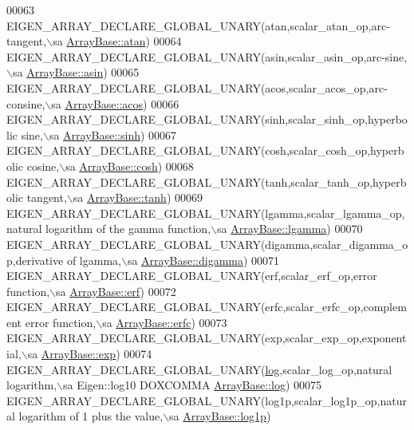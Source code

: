 \begin{DoxyCode}
00063   EIGEN\_ARRAY\_DECLARE\_GLOBAL\_UNARY(atan,scalar\_atan\_op,arc-tangent,\(\backslash\)sa 
      \hyperlink{group___core___module_a3d7c83346563ef1abac3c75615959595}{ArrayBase::atan})
00064   EIGEN\_ARRAY\_DECLARE\_GLOBAL\_UNARY(asin,scalar\_asin\_op,arc-sine,\(\backslash\)sa 
      \hyperlink{group___core___module_a6d090b549b70fcb9468d16341c2204f2}{ArrayBase::asin})
00065   EIGEN\_ARRAY\_DECLARE\_GLOBAL\_UNARY(acos,scalar\_acos\_op,arc-consine,\(\backslash\)sa 
      \hyperlink{group___core___module_a823b8a01037260c26ea853f41a75dd87}{ArrayBase::acos})
00066   EIGEN\_ARRAY\_DECLARE\_GLOBAL\_UNARY(sinh,scalar\_sinh\_op,hyperbolic sine,\(\backslash\)sa 
      \hyperlink{group___core___module_a0984c5e3b76efa0c66a754ea7106f5b9}{ArrayBase::sinh})
00067   EIGEN\_ARRAY\_DECLARE\_GLOBAL\_UNARY(cosh,scalar\_cosh\_op,hyperbolic cosine,\(\backslash\)sa 
      \hyperlink{group___core___module_a5fd3dbcabcd2857db8f26ca5b321788f}{ArrayBase::cosh})
00068   EIGEN\_ARRAY\_DECLARE\_GLOBAL\_UNARY(tanh,scalar\_tanh\_op,hyperbolic tangent,\(\backslash\)sa 
      \hyperlink{group___core___module_a1e63179878d5a652fef566a67f5b4014}{ArrayBase::tanh})
00069   EIGEN\_ARRAY\_DECLARE\_GLOBAL\_UNARY(lgamma,scalar\_lgamma\_op,natural logarithm of the gamma \textcolor{keyword}{function},\(\backslash\)sa 
      \hyperlink{group___core___module_aaacc294090a265da0dc695737750dd28}{ArrayBase::lgamma})
00070   EIGEN\_ARRAY\_DECLARE\_GLOBAL\_UNARY(digamma,scalar\_digamma\_op,derivative of lgamma,\(\backslash\)sa 
      \hyperlink{group___core___module_a8fe3f90b672d2c4e80bf1c74b6b088e5}{ArrayBase::digamma})
00071   EIGEN\_ARRAY\_DECLARE\_GLOBAL\_UNARY(erf,scalar\_erf\_op,error \textcolor{keyword}{function},\(\backslash\)sa 
      \hyperlink{group___core___module_aa63d066102c083a96f0abec99a330f60}{ArrayBase::erf})
00072   EIGEN\_ARRAY\_DECLARE\_GLOBAL\_UNARY(erfc,scalar\_erfc\_op,complement error \textcolor{keyword}{function},\(\backslash\)sa 
      \hyperlink{group___core___module_a0b5dc4e2072be63b4920f7b88dc1bf83}{ArrayBase::erfc})
00073   EIGEN\_ARRAY\_DECLARE\_GLOBAL\_UNARY(exp,scalar\_exp\_op,exponential,\(\backslash\)sa 
      \hyperlink{group___core___module_a7b262ecb3e4db0f87d2eae85f2d64f15}{ArrayBase::exp})
00074   EIGEN\_ARRAY\_DECLARE\_GLOBAL\_UNARY(\hyperlink{structlog}{log},scalar\_log\_op,natural logarithm,\(\backslash\)sa Eigen::log10 DOXCOMMA 
      \hyperlink{group___core___module_a7748ba1f6891fa4e10723a8bf77b8770}{ArrayBase::log})
00075   EIGEN\_ARRAY\_DECLARE\_GLOBAL\_UNARY(log1p,scalar\_log1p\_op,natural logarithm of 1 plus the value,\(\backslash\)sa 
      \hyperlink{group___core___module_a438640146f3e7488f09a4f60c305b1d9}{ArrayBase::log1p})

\end{DoxyCode}
